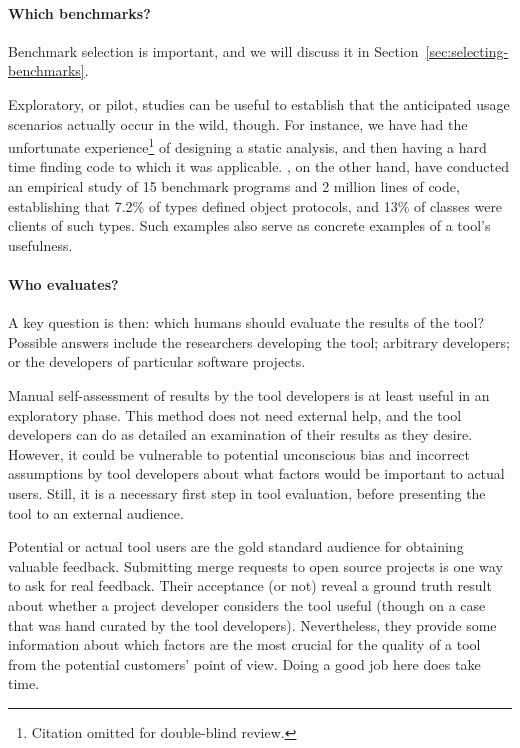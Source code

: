 \paragraph{Which benchmarks?} Benchmark selection is important,
and we will discuss it in Section~\ref{sec:selecting-benchmarks}.

Exploratory, 
or pilot, studies can be useful to establish that the
anticipated usage scenarios actually occur in the wild, though. For instance,
we have had the unfortunate experience\footnote{Citation omitted for double-blind review.} of designing a static analysis,
and then having a hard time finding code to which it was
applicable. \cite{beckman11:_empir_study_objec_protoc_wild}, on the
other hand, have conducted an empirical study of 15 benchmark programs
and 2 million lines of code, establishing that 7.2\% of types defined
object protocols, and 13\% of classes were clients of such types.
Such examples also serve as concrete examples of a tool's usefulness.


\paragraph{Who evaluates?}
A key question is then: which humans should evaluate the
results of the tool?  Possible answers include the researchers
developing the tool; arbitrary developers; or the developers of
particular software projects.

Manual self-assessment of results by the tool developers is at least
useful in an exploratory phase. This method does not need external
help, and the tool developers can do as detailed an examination of
their results as they desire. However, it could be vulnerable to
potential unconscious bias and incorrect assumptions by tool
developers about what factors would be important to actual
users. Still, it is a necessary first step in tool evaluation, before
presenting the tool to an external audience.

Potential or actual tool users are the gold standard audience for
obtaining valuable feedback. Submitting merge requests to open source
projects is one way to ask for real feedback. Their acceptance (or
not) reveal a ground truth result about whether a project developer
considers the tool useful (though on a case that was hand curated by
the tool developers). Nevertheless, they provide some information
about which factors are the most crucial for the quality of a tool
from the potential customers' point of view. Doing a good job here
does take time.

